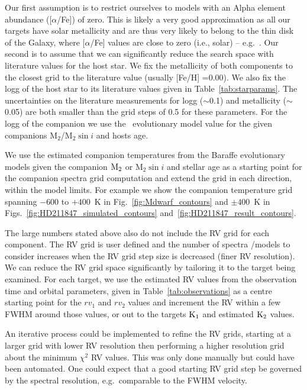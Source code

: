 \documentclass[fleqn,usenatbib]{mnras}
\begin{document}
Our first assumption is to restrict ourselves to models with an Alpha element abundance ([\(\alpha\)/Fe]) of zero. This is likely a very good approximation as all our targets have solar metallicity and are thus very likely to belong to the thin disk of the Galaxy, where [\(\alpha\)/Fe] values are close to zero (i.e., solar) -- e.g.~\citet{adibekyan_chemical_2012}. Our second is to assume that we can significantly reduce the search space with literature values for the host star. We fix the metallicity of both components to the closest grid to the literature value (usually [Fe/H] =0.00). We also fix the logg of the host star to its literature values given in Table~\ref{tab:starparams}. The uncertainties on the literature measurements for logg (\(\sim\)0.1) and metallicity (\(\sim\)0.05) are both smaller than the grid steps of 0.5 for these parameters.
For the logg of the companion we use the~\citet{baraffe_evolutionary_2003,baraffe_new_2015} evolutionary model value for the given companions \(\textrm{M}_2\)/\(\textrm{M}_2\sin{i}\) and hosts age.

We use the estimated companion temperatures from the Baraffe evolutionary models given the companion \(\rm M_2\) or \(\textrm{M}_2\sin{i}\) and stellar age as a starting point for the companion spectra grid computation and extend the grid in each direction, within the model limits. For example we show the companion temperature grid spanning \(-600\) to \(+400\)~K in Fig.~\ref{fig:Mdwarf_contours} and \(\pm400\)~K in Figs.~\ref{fig:HD211847_simulated_contours} and~\ref{fig:HD211847_result_contours}.

The large numbers stated above also do not include the RV grid for each component. The RV grid is user defined and the number of spectra /models to consider increases when the RV grid step size is decreased (finer RV resolution). We can reduce the RV grid space significantly by tailoring it to the target being examined. For each target, we use the estimated RV values from the observation time and orbital parameters, given in Table~\ref{tab:observations} as a centre starting point for the \({rv}_1\) and \({rv}_2\) values and increment the RV within a few FWHM around those values, or out to the targets \(\rm K_1\) and estimated \(\rm K_2\) values.

An iterative process could be implemented to refine the RV grids, starting at a larger grid with lower RV resolution then performing a higher resolution grid about the minimum \(\chi^2\) RV values. This was only done manually but could have been automated. One could expect that a good starting RV grid step be governed by the spectral resolution, e.g.\ comparable to the FWHM velocity.
\end{document}
